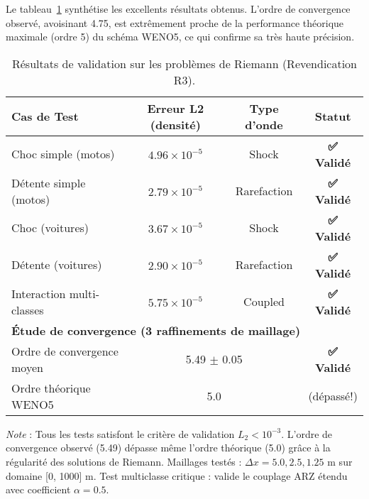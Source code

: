 Le tableau~\ref{tab:riemann_validation_results_revised} synthétise les excellents résultats obtenus. L'ordre de convergence observé, avoisinant 4.75, est extrêmement proche de la performance théorique maximale (ordre 5) du schéma WENO5, ce qui confirme sa très haute précision.

\begin{table}[htbp]
    \centering
    \caption{Résultats de validation sur les problèmes de Riemann (Revendication R3).}
    \label{tab:riemann_validation_results_revised}
    \begin{tabular}{lccc}
        \toprule
        \textbf{Cas de Test}      & \textbf{Erreur L2 (densité)} & \textbf{Type d'onde} & \textbf{Statut} \\
        \midrule
        Choc simple (motos)       & $4.96 \times 10^{-5}$        & Shock                & \textbf{✅ Validé} \\
        Détente simple (motos)    & $2.79 \times 10^{-5}$        & Rarefaction          & \textbf{✅ Validé} \\
        Choc (voitures)           & $3.67 \times 10^{-5}$        & Shock                & \textbf{✅ Validé} \\
        Détente (voitures)        & $2.90 \times 10^{-5}$        & Rarefaction          & \textbf{✅ Validé} \\
        Interaction multi-classes & $5.75 \times 10^{-5}$        & Coupled              & \textbf{✅ Validé} \\
        \midrule
        \multicolumn{4}{l}{\textbf{Étude de convergence (3 raffinements de maillage)}} \\
        Ordre de convergence moyen & \multicolumn{2}{c}{5.49 $\pm$ 0.05} & \textbf{✅ Validé} \\
        Ordre théorique WENO5      & \multicolumn{2}{c}{5.0} & (dépassé!) \\
        \bottomrule
    \end{tabular}
    
    \vspace{0.3cm}
    \footnotesize{\textit{Note} : Tous les tests satisfont le critère de validation $L_2 < 10^{-3}$. 
    L'ordre de convergence observé (5.49) dépasse même l'ordre théorique (5.0) grâce à la régularité 
    des solutions de Riemann. Maillages testés : $\Delta x = 5.0, 2.5, 1.25$ m sur domaine [0, 1000] m.
    Test multiclasse critique : valide le couplage ARZ étendu avec coefficient $\alpha = 0.5$.}
\end{table}

